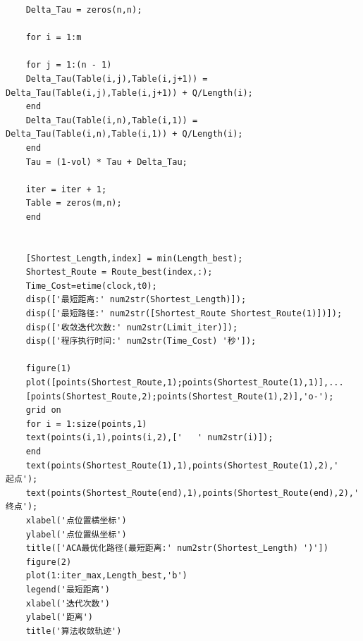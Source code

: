 \documentclass[UTF8]{ctexart}
\begin{document}
\begin{lstlisting}
	Delta_Tau = zeros(n,n);

	for i = 1:m

	for j = 1:(n - 1)
	Delta_Tau(Table(i,j),Table(i,j+1)) = Delta_Tau(Table(i,j),Table(i,j+1)) + Q/Length(i);
	end
	Delta_Tau(Table(i,n),Table(i,1)) = Delta_Tau(Table(i,n),Table(i,1)) + Q/Length(i);
	end
	Tau = (1-vol) * Tau + Delta_Tau;
	
	iter = iter + 1;
	Table = zeros(m,n);
	end
	
	
	[Shortest_Length,index] = min(Length_best);
	Shortest_Route = Route_best(index,:);
	Time_Cost=etime(clock,t0);
	disp(['最短距离:' num2str(Shortest_Length)]);
	disp(['最短路径:' num2str([Shortest_Route Shortest_Route(1)])]);
	disp(['收敛迭代次数:' num2str(Limit_iter)]);
	disp(['程序执行时间:' num2str(Time_Cost) '秒']);
	
	figure(1)
	plot([points(Shortest_Route,1);points(Shortest_Route(1),1)],...  
	[points(Shortest_Route,2);points(Shortest_Route(1),2)],'o-');
	grid on
	for i = 1:size(points,1)
	text(points(i,1),points(i,2),['   ' num2str(i)]);
	end
	text(points(Shortest_Route(1),1),points(Shortest_Route(1),2),'       起点');
	text(points(Shortest_Route(end),1),points(Shortest_Route(end),2),'       终点');
	xlabel('点位置横坐标')
	ylabel('点位置纵坐标')
	title(['ACA最优化路径(最短距离:' num2str(Shortest_Length) ')'])
	figure(2)
	plot(1:iter_max,Length_best,'b')
	legend('最短距离')
	xlabel('迭代次数')
	ylabel('距离')
	title('算法收敛轨迹')
	
	
	
	\end{lstlisting}
	
\end{document}

